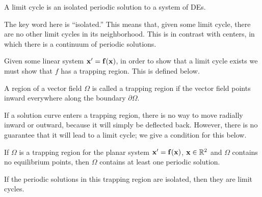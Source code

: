 \documentclass[../m082main.tex]{subfiles}
\begin{document}
\begin{definition}
    A limit cycle is an isolated periodic solution to a system of DEs.
\end{definition}

The key word here is ``isolated.''
This means that, given some limit cycle, there are no other limit cycles in its neighborhood.
This is in contrast with centers, in which there is a continuum of periodic solutions.

Given some linear system $\mathbf{x}' = \mathbf{f} (\mathbf{x})$, in order to show that a limit cycle exists we must show that $f$ has a trapping region.
This is defined below.

\begin{definition}
    A region of a vector field $\Omega$ is called a trapping region if the vector field points inward everywhere along the boundary $\partial \Omega$.
\end{definition}

If a solution curve enters a trapping region, there is no way to move radially inward or outward, because it will simply be deflected back.
However, there is no guarantee that it will lead to a limit cycle; we give a condition for this below.

\begin{theorem}
    If $\Omega$ is a trapping region for the planar system $\mathbf{x}' = \mathbf{f}(\mathbf{x})$, $\mathbf{x} \in \mathbb{R}^2$ and $\Omega$ contains no equilibrium points, then $\Omega$ contains at least one periodic solution.
\end{theorem}

If the periodic solutions in this trapping region are isolated, then they are limit cycles.
\end{document}
